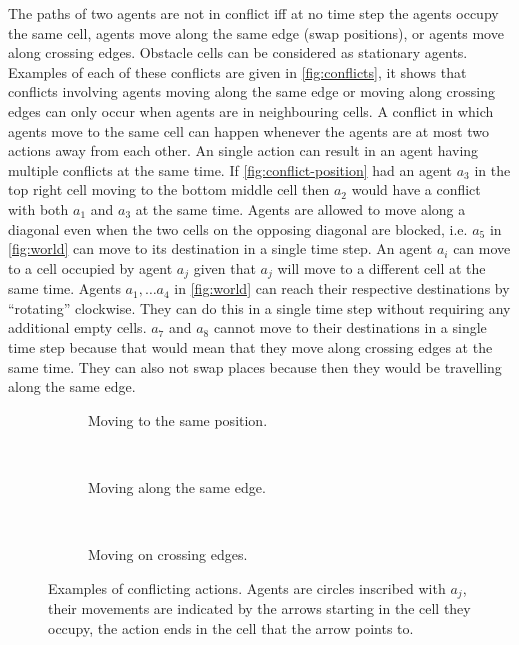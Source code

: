 The paths of two agents are not in conflict iff at no time step the agents
occupy the same cell, agents move along the same edge (swap positions), or
agents move along crossing edges. Obstacle cells can be considered as
stationary agents. Examples of each of these conflicts are given
in \autoref{fig:conflicts}, it shows that conflicts involving agents moving
along the same edge or moving along crossing edges can only occur when agents
are in neighbouring cells. A conflict in which agents move to the same cell can
happen whenever the agents are at most two actions away from each other. An
single action can result in an agent having multiple conflicts at the same
time. If \autoref{fig:conflict-position} had an agent $a_3$ in the top right
cell moving to the bottom middle cell then $a_2$ would have a conflict with
both $a_1$ and $a_3$ at the same time.
Agents are allowed to move along a diagonal even when the two cells on the
opposing diagonal are blocked, i.e. $a_5$ in \autoref{fig:world} can move to its
destination in a single time step. An agent $a_i$ can move to a cell occupied by
agent $a_j$ given that $a_j$ will move to a different cell at the same time.
Agents $a_1, \ldots a_4$ in \autoref{fig:world} can reach their respective
destinations
by ``rotating'' clockwise. They can do this in a single time step without
requiring any additional empty cells. $a_7$ and $a_8$ cannot move to their
destinations in a single time step because that would mean that they move along
crossing edges at the same time. They can also not swap places because then
they would be travelling along the same edge.

\begin{figure}[b]
	\centering
	\begin{subfigure}[b]{.3\textwidth}
		\centering
	    \def\svgscale{.7}
		
		\caption{Moving to the same position.}
		\label{fig:conflict-position}
	\end{subfigure}
	~
	\begin{subfigure}[b]{.3\textwidth}
		\centering
	    \def\svgscale{.7}
		
		\caption{Moving along the same edge.}
		\label{fig:conflict-same}
	\end{subfigure}
	~
	\begin{subfigure}[b]{.3\textwidth}
		\centering
  \def\svgscale{.7}
		
		\caption{Moving on crossing edges.}
		\label{fig:conflict-crossing}
	\end{subfigure}
	\caption{Examples of conflicting actions. Agents are circles inscribed with
	$a_j$, their movements are indicated by the arrows starting in the cell
	they occupy, the action ends in the cell that the arrow points to.}
	\label{fig:conflicts}
\end{figure}